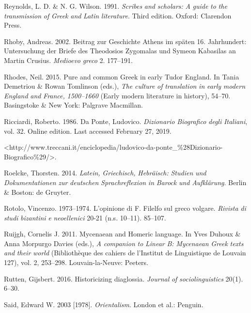 \documentclass[output=paper]{langsci/langscibook}
\begin{document}
Reynolds, L. D. \& N. G. Wilson. 1991. \textit{Scribes} \textit{and} \textit{scholars:} \textit{A} \textit{guide} \textit{to} \textit{the} \textit{transmission} \textit{of} \textit{Greek} \textit{and} \textit{Latin} \textit{literature}. Third edition. Oxford: Clarendon Press.

Rhoby, Andreas. 2002. Beitrag zur Geschichte Athens im späten 16. Jahrhundert: Untersuchung der Briefe des Theodosios Zygomalas und Symeon Kabasilas an Martin Crusius. \textit{Medioevo} \textit{greco} 2. 177–191.

Rhodes, Neil. 2015. Pure and common Greek in early Tudor England. In Tania Demetriou \& Rowan Tomlinson (eds.), \textit{The} \textit{culture} \textit{of} \textit{translation} \textit{in} \textit{early} \textit{modern} \textit{England} \textit{and} \textit{France,} \textit{1500–1660} (Early modern literature in history), 54–70. Basingstoke \& New York: Palgrave Macmillan.

Ricciardi, Roberto. 1986. Da Ponte, Ludovico. \textit{Dizionario} \textit{Biografico} \textit{degli} \textit{Italiani}, vol. 32. Online edition. Last accessed February 27, 2019.

<http://www.treccani.it/enciclopedia/ludovico-da-ponte\_\%28Dizionario-Biografico\%29/>.

Roelcke, Thorsten. 2014. \textit{Latein,} \textit{Griechisch,} \textit{Hebräisch:} \textit{Studien} \textit{und} \textit{Dokumentationen} \textit{zur} \textit{deutschen} \textit{Sprachreflexion} \textit{in} \textit{Barock} \textit{und} \textit{Aufklärung}. Berlin \& Boston: de Gruyter.

Rotolo, Vincenzo. 1973–1974. L’opinione di F. Filelfo sul greco volgare. \textit{Rivista} \textit{di} \textit{studi} \textit{bizantini} \textit{e} \textit{neoellenici} 20-21 (n.s. 10–11). 85–107.

Ruijgh, Cornelis J. 2011. Mycenaean and Homeric language. In Yves Duhoux \& Anna Morpurgo Davies (eds.), \textit{A} \textit{companion} \textit{to} \textit{Linear} \textit{B:} \textit{Mycenaean} \textit{Greek} \textit{texts} \textit{and} \textit{their} \textit{world} (Bibliothèque des cahiers de l’Institut de Linguistique de Louvain 127), vol. 2, 253–298. Louvain-la-Neuve: Peeters.

Rutten, Gijsbert. 2016. Historicizing diaglossia. \textit{Journal} \textit{of} \textit{sociolinguistics} 20(1). 6–30.

Said, Edward W. 2003 [1978]. \textit{Orientalism}. London et al.: Penguin.
\end{document}
